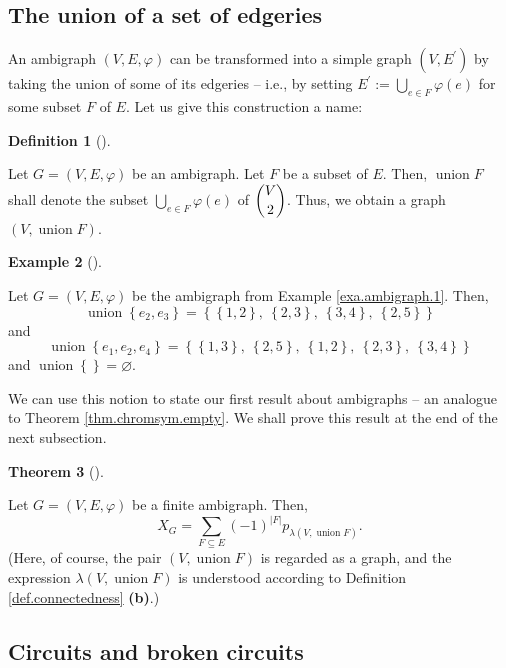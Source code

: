 \documentclass[numbers=enddot,12pt,final,onecolumn,notitlepage]{scrartcl}%
\theoremstyle{definition}
\newtheorem{theo}{Theorem}[section]
\newenvironment{theorem}[1][]
{\begin{theo}[#1]\begin{leftbar}}
{\end{leftbar}\end{theo}}
\newtheorem{defi}[theo]{Definition}
\newenvironment{definition}[1][]
{\begin{defi}[#1]\begin{leftbar}}
{\end{leftbar}\end{defi}}
\newtheorem{exmp}[theo]{Example}
\newenvironment{example}[1][]
{\begin{exmp}[#1]\begin{leftbar}}
{\end{leftbar}\end{exmp}}
\let\sumnonlimits\sum
\let\bigcupnonlimits\bigcup
\renewcommand{\sum}{\sumnonlimits\limits}
\renewcommand{\bigcup}{\bigcupnonlimits\limits}
\begin{document}
\subsection{The union of a set of edgeries}

An ambigraph $\left(  V,E,\varphi\right)  $ can be transformed into a simple
graph $\left(  V,E^{\prime}\right)  $ by taking the union of some of its
edgeries -- i.e., by setting $E^{\prime}:=\bigcup_{e\in F}\varphi\left(
e\right)  $ for some subset $F$ of $E$. Let us give this construction a name:

\begin{definition}
\label{def.ambigraph.union}Let $G=\left(  V,E,\varphi\right)  $ be an
ambigraph. Let $F$ be a subset of $E$. Then, $\operatorname*{union}F$ shall
denote the subset $\bigcup_{e\in F}\varphi\left(  e\right)  $ of $\dbinom
{V}{2}$. Thus, we obtain a graph $\left(  V,\operatorname*{union}F\right)  $.
\end{definition}

\begin{example}
Let $G=\left(  V,E,\varphi\right)  $ be the ambigraph from Example
\ref{exa.ambigraph.1}. Then,%
\[
\operatorname*{union}\left\{  e_{2},e_{3}\right\}  =\left\{  \left\{
1,2\right\}  ,\ \left\{  2,3\right\}  ,\ \left\{  3,4\right\}  ,\ \left\{
2,5\right\}  \right\}
\]
and%
\[
\operatorname*{union}\left\{  e_{1},e_{2},e_{4}\right\}  =\left\{  \left\{
1,3\right\}  ,\ \left\{  2,5\right\}  ,\ \left\{  1,2\right\}  ,\ \left\{
2,3\right\}  ,\ \left\{  3,4\right\}  \right\}
\]
and $\operatorname*{union}\left\{  {}\right\}  =\varnothing$.
\end{example}

We can use this notion to state our first result about ambigraphs -- an
analogue to Theorem \ref{thm.chromsym.empty}. We shall prove this result at
the end of the next subsection.

\begin{theorem}
\label{thm.ambichromsym.empty}Let $G=\left(  V,E,\varphi\right)  $ be a finite
ambigraph. Then,%
\[
X_{G}=\sum_{F\subseteq E}\left(  -1\right)  ^{\left\vert F\right\vert
}p_{\lambda\left(  V,\operatorname*{union}F\right)  }.
\]
(Here, of course, the pair $\left(  V,\operatorname*{union}F\right)  $ is
regarded as a graph, and the expression $\lambda\left(
V,\operatorname*{union}F\right)  $ is understood according to Definition
\ref{def.connectedness} \textbf{(b)}.)
\end{theorem}

\subsection{Circuits and broken circuits}
\end{document}
